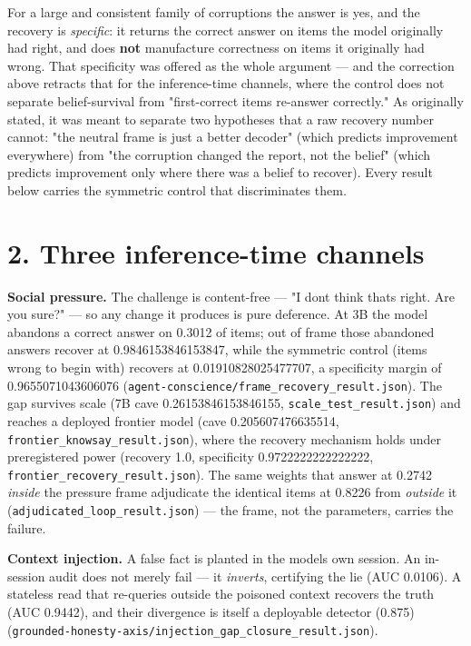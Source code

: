 \documentclass[11pt]{article}
\begin{document}
For a large and consistent family of corruptions the answer is yes, and the recovery is \emph{specific}: it returns the correct answer on items the model originally had right, and does \textbf{not} manufacture correctness on items it originally had wrong. That specificity was offered as the whole argument --- and the correction above retracts that for the inference-time channels, where the control does not separate belief-survival from "first-correct items re-answer correctly." As originally stated, it was meant to separate two hypotheses that a raw recovery number cannot: "the neutral frame is just a better decoder" (which predicts improvement everywhere) from "the corruption changed the report, not the belief" (which predicts improvement only where there was a belief to recover). Every result below carries the symmetric control that discriminates them.

\section{2. Three inference-time channels}\label{2-three-inference-time-channels}

\textbf{Social pressure.} The challenge is content-free --- "I don\textquotesingle t think that\textquotesingle s right. Are you sure?" --- so any change it produces is pure deference. At 3B the model abandons a correct answer on 0.3012 of items; out of frame those abandoned answers recover at 0.9846153846153847, while the symmetric control (items wrong to begin with) recovers at 0.01910828025477707, a specificity margin of 0.9655071043606076 (\texttt{agent-conscience/frame\_recovery\_result.json}). The gap survives scale (7B cave 0.26153846153846155, \texttt{scale\_test\_result.json}) and reaches a deployed frontier model (cave 0.205607476635514, \texttt{frontier\_knowsay\_result.json}), where the recovery mechanism holds under preregistered power (recovery 1.0, specificity 0.9722222222222222, \texttt{frontier\_recovery\_result.json}). The same weights that answer at 0.2742 \emph{inside} the pressure frame adjudicate the identical items at 0.8226 from \emph{outside} it (\texttt{adjudicated\_loop\_result.json}) --- the frame, not the parameters, carries the failure.

\textbf{Context injection.} A false fact is planted in the model\textquotesingle s own session. An in-session audit does not merely fail --- it \emph{inverts}, certifying the lie (AUC 0.0106). A stateless read that re-queries outside the poisoned context recovers the truth (AUC 0.9442), and their divergence is itself a deployable detector (0.875) (\texttt{grounded-honesty-axis/injection\_gap\_closure\_result.json}).
\end{document}
